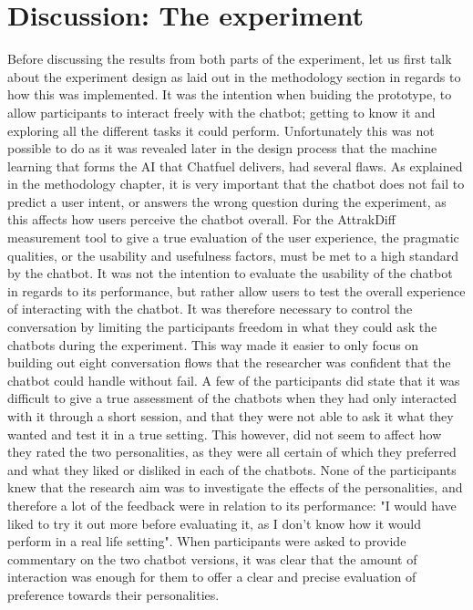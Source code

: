 \vspace{5mm}

\section{Discussion: The experiment}
Before discussing the results from both parts of the experiment, let us first talk about the experiment design as laid out in the methodology section in regards to how this was implemented. It was the intention when buiding the prototype, to allow participants to interact freely with the chatbot; getting to know it and exploring all the different tasks it could perform. Unfortunately this was not possible to do as it was revealed later in the design process that the machine learning that forms the AI that Chatfuel delivers, had several flaws. As explained in the methodology chapter, it is very important that the chatbot does not fail to predict a user intent, or answers the wrong question during the experiment, as this affects how users perceive the chatbot overall. For the AttrakDiff measurement tool to give a true evaluation of the user experience, the pragmatic qualities, or the usability and usefulness factors, must be met to a high standard by the chatbot. It was not the intention to evaluate the usability of the chatbot in regards to its performance, but rather allow users to test the overall experience of interacting with the chatbot. It was therefore necessary to control the conversation by limiting the participants freedom in what they could ask the chatbots during the experiment. This way made it easier to only focus on building out eight conversation flows that the researcher was confident that the chatbot could handle without fail. A few of the participants did state that it was difficult to give a true assessment of the chatbots when they had only interacted with it through a short session, and that they were not able to ask it what they wanted and test it in a true setting. This however, did not seem to affect how they rated the two personalities, as they were all certain of which they preferred and what they liked or disliked in each of the chatbots. None of the participants knew that the research aim was to investigate the effects of the personalities, and therefore a lot of the feedback were in relation to its performance: "I would have liked to try it out more before evaluating it, as I don't know how it would perform in a real life setting". When participants were asked to provide commentary on the two chatbot versions, it was clear that the amount of interaction was enough for them to offer a clear and precise evaluation of preference towards their personalities. 

